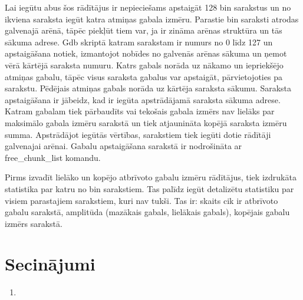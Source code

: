 Lai iegūtu abus šos rādītājus ir nepieciešams apstaigāt 128 bin sarakstus un no ikviena saraksta iegūt katra atmiņas gabala izmēru.
Parastie bin saraksti atrodas galvenajā arēnā, tāpēc piekļūt tiem var, ja ir zināma arēnas struktūra un tās sākuma adrese.
Gdb skriptā katram sarakstam ir numurs no 0 līdz 127 un apstaigāšana notiek, izmantojot nobīdes no galvenās arēnas sākuma un ņemot vērā kārtējā saraksta numuru.
Katrs gabals norāda uz nākamo un iepriekšējo atmiņas gabalu, tāpēc visus saraksta gabalus var apstaigāt, pārvietojoties pa sarakstu.
Pēdējais atmiņas gabals norāda uz kārtēja saraksta sākumu.
Saraksta apstaigāšana ir jābeidz, kad ir iegūta apstrādājamā saraksta sākuma adrese.
Katram gabalam tiek pārbaudīts vai tekošais gabala izmērs nav lielāks par maksimālo gabala izmēru sarakstā un tiek atjaunināta kopējā saraksta izmēru summa.
Apstrādājot iegūtās vērtības, sarakstiem tiek iegūti dotie rādītāji galvenajai arēnai.
Gabalu apstaigāšana sarakstā ir nodrošināta ar free\_chunk\_list komandu.

Pirms izvadīt lielāko un kopējo atbrīvoto gabalu izmēru rādītājus, tiek izdrukāta statistika par katru no bin sarakstiem.
Tas palīdz iegūt detalizētu statistiku par visiem parastajiem sarakstiem, kuri nav tukši.
Tas ir: skaits cik ir atbrīvoto gabalu sarakstā, amplitūda (mazākais gabals, lielākais gabals), kopējais gabalu izmērs sarakstā.


\section{Secinājumi}
\begin{enumerate}
\item
\end{enumerate}


